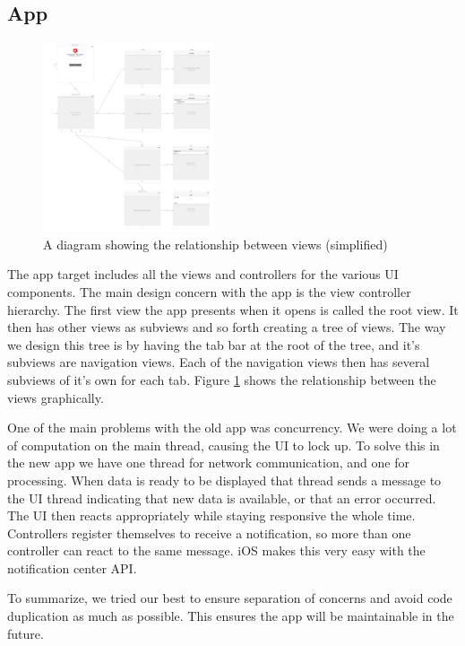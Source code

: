\documentclass[pdftex, DIV=calc, paper=a4, fontsize=11pt, twocolumn]{scrartcl}	 %
\begin{document}
\subsection*{App}

\begin{figure}
    \includegraphics[width=0.45\textwidth]{view-tree.png}
    \caption{A diagram showing the relationship between views (simplified)}
    \label{fig:hierarchy}
\end{figure}

The app target includes all the views and controllers for the various UI components. 
The main design concern with the app is the view controller hierarchy. The first view the app 
presents when it opens is called the root view. It then has other views as subviews and so forth
creating a tree of views. The way we design this tree is by having the tab bar at the root of the
tree, and it's subviews are navigation views. Each of the navigation views then has several subviews
of it's own for each tab. Figure \ref{fig:hierarchy} shows the relationship between the views
graphically.

One of the main problems with the old app was concurrency. We were doing a lot of computation on 
the main thread, causing the UI to lock up. To solve this in the new app we have one thread for 
network communication, and one for processing. When data is ready to be displayed that thread sends
a message to the UI thread indicating that new data is available, or that an error occurred. The UI
then reacts appropriately while staying responsive the whole time. Controllers register themselves 
to receive a notification, so more than one controller can react to the same message. iOS makes this
very easy with the notification center API.

To summarize, we tried our best to ensure separation of concerns and avoid code duplication as much
as possible. This ensures the app will be maintainable in the future.
\end{document}
